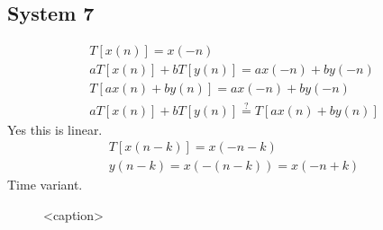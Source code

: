 \documentclass{article}
\begin{document}
\subsection*{System 7}
\begin{gather*}
    T[x(n)] = x(-n)\\
    aT[x(n)] + bT[y(n)] = ax(-n) + by(-n)\\
    T[ax(n) + by(n)] = ax(-n) + by(-n)\\
    aT[x(n)] + bT[y(n)] \overset{?}{=} T[ax(n) + by(n)]
\end{gather*} Yes this is linear.
\begin{gather*}
    T[x(n - k)] = x(-n - k)\\
    y(n-k) = x(-(n-k)) = x(-n+k)
\end{gather*} Time variant.

\begin{figure}[htbp]
    \centering
    
    \caption{<caption>}
    \label{<label>}
\end{figure}
\end{document}

